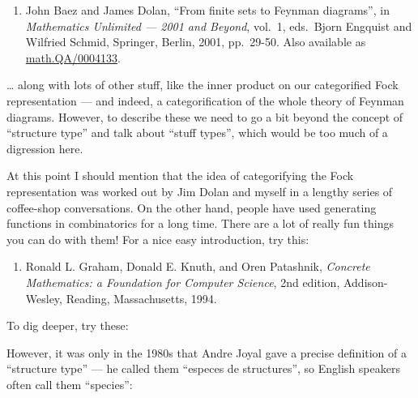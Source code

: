 \documentclass{article}
\def\tightlist{}
\renewcommand{\texttt}[1]{%
  \begingroup
  \ttfamily
  \begingroup\lccode`~=`/\lowercase{\endgroup\def~}{/\discretionary{}{}{}}%
  \begingroup\lccode`~=`[\lowercase{\endgroup\def~}{[\discretionary{}{}{}}%
  \begingroup\lccode`~=`.\lowercase{\endgroup\def~}{.\discretionary{}{}{}}%
  \catcode`/=\active\catcode`[=\active\catcode`.=\active
  \scantokens{#1\noexpand}%
  \endgroup
}
\begin{document}
\begin{enumerate}
\def\labelenumi{\arabic{enumi})}
\setcounter{enumi}{2}
\tightlist
\item
  John Baez and James Dolan, ``From finite sets to Feynman diagrams'',
  in \emph{Mathematics Unlimited --- 2001 and Beyond}, vol.~1,
  eds.~Bjorn Engquist and Wilfried Schmid, Springer, Berlin, 2001,
  pp.~29-50. Also available as
  \href{https://arxiv.org/abs/math.QA/0004133}{math.QA/0004133}.
\end{enumerate}

\ldots{} along with lots of other stuff, like the inner product on our
categorified Fock representation --- and indeed, a categorification of
the whole theory of Feynman diagrams. However, to describe these we need
to go a bit beyond the concept of ``structure type'' and talk about
``stuff types'', which would be too much of a digression here.

At this point I should mention that the idea of categorifying the Fock
representation was worked out by Jim Dolan and myself in a lengthy
series of coffee-shop conversations. On the other hand, people have used
generating functions in combinatorics for a long time. There are a lot
of really fun things you can do with them! For a nice easy introduction,
try this:

\begin{enumerate}
\def\labelenumi{\arabic{enumi})}
\setcounter{enumi}{3}
\tightlist
\item
  Ronald L. Graham, Donald E. Knuth, and Oren Patashnik, \emph{Concrete
  Mathematics: a Foundation for Computer Science}, 2nd edition,
  Addison-Wesley, Reading, Massachusetts, 1994.
\end{enumerate}

To dig deeper, try these:


However, it was only in the 1980s that Andre Joyal gave a precise
definition of a ``structure type'' --- he called them ``especes de
structures'', so English speakers often call them ``species'':
\end{document}
